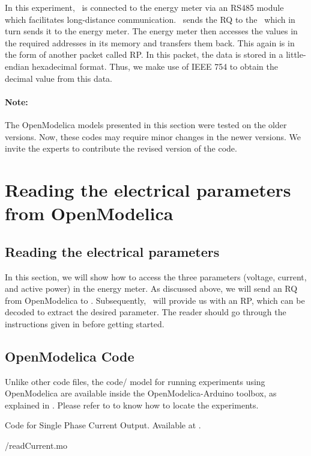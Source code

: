 In this experiment, \arduino\ is connected to the energy meter via an RS485 module which facilitates long-distance communication. 
\scilab\ sends the RQ to the \arduino\, which in turn sends it to the
energy meter. The energy meter then accesses the values in the
required addresses in its memory and transfers them back. This again
is in the form of another packet called RP. In this packet, the data is stored in a little-endian hexadecimal format. Thus, we make use of IEEE 754 to obtain the decimal value from this data. 

\paragraph{Note: } The OpenModelica models presented in this section were tested on the older versions. Now, these codes may require minor changes in
the newer versions. We invite the experts to contribute the revised version of the code.


\section{Reading the electrical parameters from OpenModelica}
\subsection{Reading the electrical parameters}
In this section, we will show how to access the three parameters (voltage, current, and active power) in the energy meter. As discussed above, we will send an RQ from OpenModelica to \arduino. Subsequently, \arduino\ will provide us with an RP, which can be decoded to extract the desired parameter. The reader should go through the instructions given in  before getting started. 

\subsection{OpenModelica Code}
Unlike other code files, the code/ model for running experiments using OpenModelica are available inside the OpenModelica-Arduino toolbox, as explained in . Please refer to  to know how to locate the experiments. 

\label{sec:modbus-OpenModelica-code}

\begin{OpenModelicacode}
  {Code for Single Phase Current Output.
    Available at .}
  \label{OpenModelica:current-modbus}
  
  {\LocMODOpenModelicacode/readCurrent.mo}
\end{OpenModelicacode}

